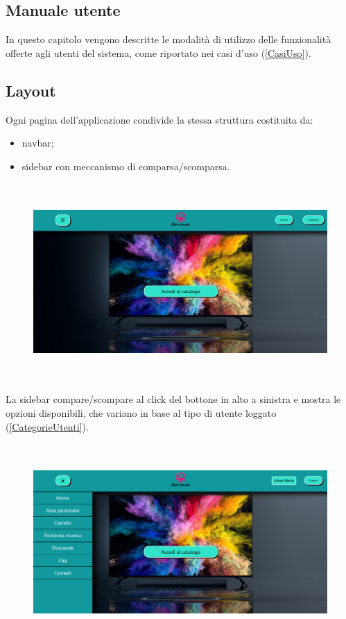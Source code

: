 \documentclass[a4paper, 14pt]{article}
\begin{document}
\begin{flushleft}
	
	\section{Manuale utente}
		\graphicspath{{"./img/"}}
		In questo capitolo vengono descritte le modalità di utilizzo delle funzionalità offerte agli utenti del sistema, come riportato nei casi d'uso (\ref{CasiUso}).
			\subsection{Layout}
				Ogni pagina dell'applicazione condivide la stessa struttura costituita da:
				\begin{itemize}
					\item navbar;
					\item sidebar con meccanismo di comparsa/scomparsa.
				\end{itemize}
				\begin{figure}[H]
					\centering
					\includegraphics[height=7.5cm, frame=2pt]{"screenHomepage.png"}
				\end{figure}
				La sidebar compare/scompare al click del bottone in alto a sinistra e mostra le opzioni disponibili,
				che variano in base al tipo di utente loggato (\ref{CategorieUtenti}).
				\begin{figure}[H]
					\centering
					\includegraphics[height=7.5cm, frame=2pt]{"screenHomepageCliente.png"}
				\end{figure}
				

\end{flushleft}
\end{document}
